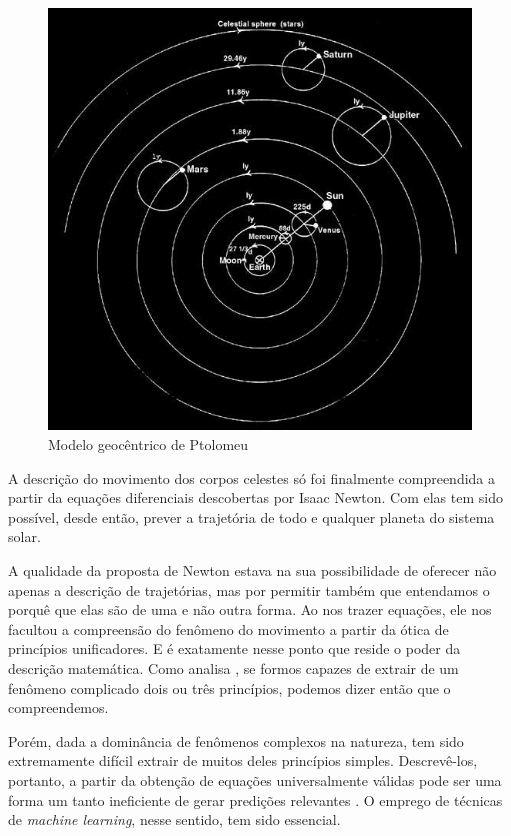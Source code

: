 \begin{figure}[htb]
	\caption{\label{Ptolomeu} Modelo geocêntrico de Ptolomeu}
	\begin{center}
	    \includegraphics[scale=0.5]{imagens/ptolemy}
	\end{center}
\end{figure}

A descrição do movimento dos corpos celestes só foi finalmente compreendida a partir da equações diferenciais descobertas por Isaac Newton. Com elas tem sido possível, desde então, prever a trajetória de todo e qualquer planeta do sistema solar.

A qualidade da proposta de Newton estava na sua possibilidade de oferecer não apenas a descrição de trajetórias, mas por permitir também que entendamos o porquê que elas são de uma e não outra forma. Ao nos trazer equações, ele nos facultou a compreensão do fenômeno do movimento a partir da ótica de princípios unificadores. E é exatamente nesse ponto que reside o poder da descrição matemática. Como analisa , se formos capazes de extrair de um fenômeno complicado dois ou três princípios, podemos dizer então que o compreendemos.

Porém, dada a dominância de fenômenos complexos na natureza, tem sido extremamente difícil extrair de muitos deles princípios simples. Descrevê-los, portanto, a partir da obtenção de equações universalmente válidas pode ser uma forma um tanto ineficiente de gerar predições relevantes \cite{Vutha}. O emprego de técnicas de \textit{machine learning}, nesse sentido, tem sido essencial.

